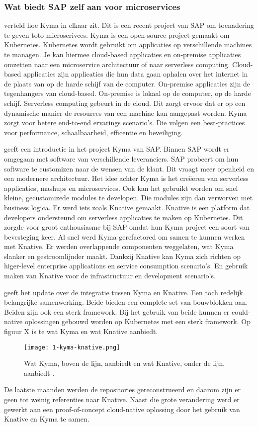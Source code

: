 \subsubsection{Wat biedt SAP zelf aan voor microservices}
\textcite{Kyma2019} verteld hoe Kyma in elkaar zit. Dit is een recent project van SAP om toenadering te geven toto microserivces. Kyma is een open-source project gemaakt om Kubernetes. Kubernetes wordt gebruikt om applicaties op verschillende machines te managen. Je kan hiermee cloud-based applicaties en on-premise applicaties omzetten naar een microservice architectuur of naar serverless computing. Cloud-based applicaties zijn applicaties die hun data gaan ophalen over het internet in de plaats van op de harde schijf van de computer. On-premise applicaties zijn de tegenhangers van cloud-based. On-premise is lokaal op de computer, op de harde schijf. Serverless computing gebeurt in de cloud. Dit zorgt ervoor dat er op een dynamische manier de resources van een machine kan aangepast worden. 
Kyma zorgt voor betere end-to-end ervarings scenario's. Die volgen een best-practices voor performance, schaalbaarheid, efficentie en beveiliging. 

\textcite{Semerdzhiev2018} geeft een introductie in het project Kyma van SAP. Binnen SAP wordt er omgegaan met software van verschillende leveranciers. SAP probeert om hun software te customizen naar de wensen van de klant. Dit vraagt meer openheid en een modernere architectuur. 
Het idee achter Kyma is het creëeren van serverless applicaties, mashups en microservices. Ook kan het gebruikt worden om snel kleine, gecustomizede modules te developen. Die modules zijn dan verworven met business logica. 
Er werd iets zoals Knative gemaakt. Knative is een platform dat developers ondersteund om serverless applicaties te maken op Kubernetes. Dit zorgde voor groot enthousiasme bij SAP omdat hun Kyma project een soort van bevesteging keer. Al snel werd Kyma gerefactored om samen te kunnen werken met Knative. Er werden overlappende componenten weggelaten, wat Kyma slanker en gestroomlijnder maakt. Dankzij Knative kan Kyma zich richten op higer-level enterprise applications en service consumption scenario's. En gebruik maken van Knative voor de infrastructuur en development scenario's. 

\textcite{Hofmann2018} geeft het update over de integratie tussen Kyma en Knative. Een toch redelijk belangrijke samenwerking. Beide bieden een complete set van bouwblokken aan. Beiden zijn ook een sterk framework. Bij het gebruik van beide kunnen er could-native oplossingen gebouwd worden op Kubernetes met een sterk framework. Op figuur X is te wat Kyma en wat Knative aanbiedt. 
\begin{figure}[h]
	\texttt{[image: 1-kyma-knative.png]}
	\caption{Wat Kyma, boven de lijn, aanbiedt en wat Knative, onder de lijn, aanbiedt \textcite{Hofmann2018}.}
	\centering
\end{figure}
De laatste maanden werden de repositories gereconstrueerd en daarom zijn er geen tot weinig referenties naar Knative. Naast die grote verandering werd er gewerkt aan een proof-of-concept cloud-native oplossing door het gebruik van Knative en Kyma te samen. 

